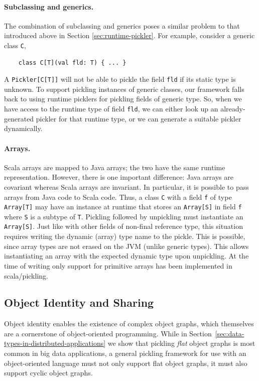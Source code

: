 \documentclass[preprint,10pt]{sigplanconf}
\theoremstyle{definition}
\theoremstyle{definition}
\newcommand{\term}[1]{\mbox{\texttt{#1}}}
\begin{document}
\paragraph{Subclassing and generics.} The combination of subclassing and generics
poses a similar problem to that introduced above in Section \ref{sec:runtime-pickler}.
For example, consider a generic class \term{C},

\begin{lstlisting}
    class C[T](val fld: T) { ... }
\end{lstlisting}

A \term{Pickler[C[T]]} will not be able to pickle the field \term{fld} if its
static type is unknown. To support pickling instances of generic classes, our
framework falls back to using runtime picklers for pickling fields of generic
type. So, when we have access to the runtime type of field \term{fld}, we can
either look up an already-generated pickler for that runtime type, or we can
generate a suitable pickler dynamically.

\paragraph{Arrays.} Scala arrays are mapped to Java arrays;  the two have the
same runtime representation. However, there is one important difference: Java
arrays are covariant whereas Scala arrays are invariant. In particular, it is
possible to pass arrays from Java code to Scala code. Thus, a class \verb|C|
with a field \verb|f| of type \verb|Array[T]| may have an instance at runtime
that stores an \verb|Array[S]| in field \verb|f| where \verb|S| is a subtype
of \verb|T|. Pickling followed by unpickling must instantiate an
\verb|Array[S]|. Just like with other fields of non-final reference type, this
situation requires writing the dynamic (array) type name to the pickle. This
is possible, since array types are not erased on the JVM (unlike generic
types). This allows instantiating an array with the expected dynamic type upon
unpickling. At the time of writing only support for primitive arrays has been
implemented in scala/pickling.


\subsection{Object Identity and Sharing}
\label{sec:object-identity}

Object identity enables the existence of complex object graphs, which
themselves are a cornerstone of object-oriented programming. While in
Section~\ref{sec:data-types-in-distributed-applications} we show that pickling
\textit{flat} object graphs is most common in big data applications, a general
pickling framework for use with an object-oriented language must not only
support flat object graphs, it must also support cyclic object graphs.
\end{document}
